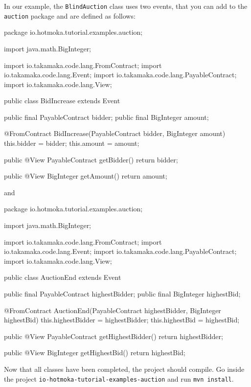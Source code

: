 In our example, the \texttt{BlindAuction} class uses two events, that you can add
to the \texttt{auction} package and are defined as follows:
%
\begin{codebox}\begin{javalst}
package io.hotmoka.tutorial.examples.auction;

import java.math.BigInteger;

import io.takamaka.code.lang.FromContract;
import io.takamaka.code.lang.Event;
import io.takamaka.code.lang.PayableContract;
import io.takamaka.code.lang.View;

public class BidIncrease extends Event {
  public final PayableContract bidder;
  public final BigInteger amount;

  @FromContract BidIncrease(PayableContract bidder, BigInteger amount) {
    this.bidder = bidder;
    this.amount = amount;
  }

  public @View PayableContract getBidder() {
    return bidder;
  }

  public @View BigInteger getAmount() {
    return amount;
  }
}
\end{javalst}\end{codebox}
%
and
%
\begin{codebox}\begin{javalst}
package io.hotmoka.tutorial.examples.auction;

import java.math.BigInteger;

import io.takamaka.code.lang.FromContract;
import io.takamaka.code.lang.Event;
import io.takamaka.code.lang.PayableContract;
import io.takamaka.code.lang.View;

public class AuctionEnd extends Event {
  public final PayableContract highestBidder;
  public final BigInteger highestBid;

  @FromContract AuctionEnd(PayableContract highestBidder, BigInteger highestBid) {
    this.highestBidder = highestBidder;
    this.highestBid = highestBid;
  }

  public @View PayableContract getHighestBidder() {
    return highestBidder;
  }

  public @View BigInteger getHighestBid() {
  return highestBid;
  }
}
\end{javalst}\end{codebox}

Now that all classes have been completed, the project should compile.
Go inside the project \texttt{io-hotmoka-tutorial-examples-auction} and run
\texttt{mvn install}.

